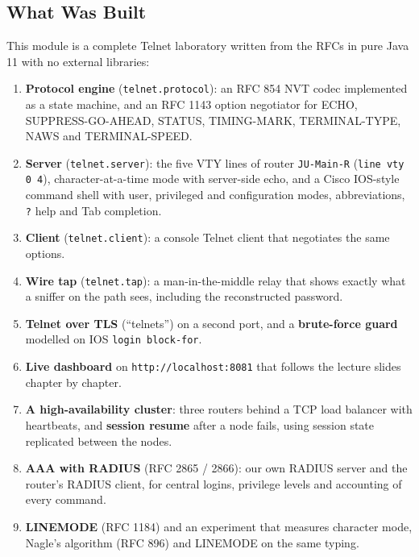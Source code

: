 \documentclass[11pt,a4paper]{article}
\begin{document}
\subsection{What Was Built}
This module is a complete Telnet laboratory written from the RFCs in pure Java 11 with no external libraries:
\begin{enumerate}[leftmargin=2em]
    \item \textbf{Protocol engine} (\texttt{telnet.protocol}): an RFC 854 NVT codec implemented as a state machine, and an RFC 1143 option negotiator for ECHO, SUPPRESS-GO-AHEAD, STATUS, TIMING-MARK, TERMINAL-TYPE, NAWS and TERMINAL-SPEED.
    \item \textbf{Server} (\texttt{telnet.server}): the five VTY lines of router \texttt{JU-Main-R} (\texttt{line vty 0 4}), character-at-a-time mode with server-side echo, and a Cisco IOS-style command shell with user, privileged and configuration modes, abbreviations, \texttt{?} help and Tab completion.
    \item \textbf{Client} (\texttt{telnet.client}): a console Telnet client that negotiates the same options.
    \item \textbf{Wire tap} (\texttt{telnet.tap}): a man-in-the-middle relay that shows exactly what a sniffer on the path sees, including the reconstructed password.
    \item \textbf{Telnet over TLS} (``telnets'') on a second port, and a \textbf{brute-force guard} modelled on IOS \texttt{login block-for}.
    \item \textbf{Live dashboard} on \texttt{http://localhost:8081} that follows the lecture slides chapter by chapter.
    \item \textbf{A high-availability cluster}: three routers behind a TCP load balancer with heartbeats, and \textbf{session resume} after a node fails, using session state replicated between the nodes.
    \item \textbf{AAA with RADIUS} (RFC 2865 / 2866): our own RADIUS server and the router's RADIUS client, for central logins, privilege levels and accounting of every command.
    \item \textbf{LINEMODE} (RFC 1184) and an experiment that measures character mode, Nagle's algorithm (RFC 896) and LINEMODE on the same typing.
\end{enumerate}
\end{document}
